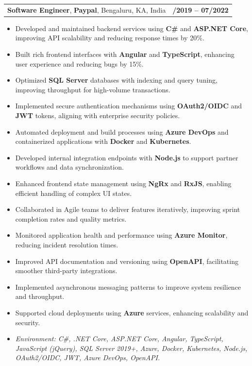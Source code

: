 \documentclass[letterpaper,11pt]{article}
\makeatletter
\newcommand{\resumeItem}[1]{
  \item\footnotesize{
    {#1 \vspace{-2pt}}
  }
}
\newcommand{\resumeSubheading}[4]{
  \vspace{-2pt}\item
    \begin{tabular*}{1.0\textwidth}[t]{l@{\extracolsep{\fill}}r}
      \textbf{\fontsize{10pt}{14pt}\selectfont #3}, \textbf{\fontsize{10pt}{14pt}\selectfont #1}, \fontsize{10pt}{14pt}\selectfont #4 & \textbf{\fontsize{10pt}{14pt}\selectfont #2} \\
    \end{tabular*}\vspace{-7pt}
}
\newcommand{\resumeItemListStart}{\begin{itemize}[leftmargin=*]}
\newcommand{\resumeItemListEnd}{\end{itemize}\vspace{-5pt}}
\makeatother
\begin{document}
\resumeSubheading
{Paypal}{08/2019 -- 07/2022}
{Software Engineer}{Bengaluru, KA, India}
\resumeItemListStart
  \resumeItem{Developed and maintained backend services using \textbf{C\#} and \textbf{ASP.NET Core}, improving API scalability and reducing response times by 20\%.}
  \resumeItem{Built rich frontend interfaces with \textbf{Angular} and \textbf{TypeScript}, enhancing user experience and reducing bugs by 15\%.}
  \resumeItem{Optimized \textbf{SQL Server} databases with indexing and query tuning, improving throughput for high-volume transactions.}
  \resumeItem{Implemented secure authentication mechanisms using \textbf{OAuth2/OIDC} and \textbf{JWT} tokens, aligning with enterprise security policies.}
  \resumeItem{Automated deployment and build processes using \textbf{Azure DevOps} and containerized applications with \textbf{Docker} and \textbf{Kubernetes}.}
  \resumeItem{Developed internal integration endpoints with \textbf{Node.js} to support partner workflows and data synchronization.}
  \resumeItem{Enhanced frontend state management using \textbf{NgRx} and \textbf{RxJS}, enabling efficient handling of complex UI states.}
  \resumeItem{Collaborated in Agile teams to deliver features iteratively, improving sprint completion rates and quality metrics.}
  \resumeItem{Monitored application health and performance using \textbf{Azure Monitor}, reducing incident resolution times.}
  \resumeItem{Improved API documentation and versioning using \textbf{OpenAPI}, facilitating smoother third-party integrations.}
  \resumeItem{Implemented asynchronous messaging patterns to improve system resilience and throughput.}
  \resumeItem{Supported cloud deployments using \textbf{Azure} services, enhancing scalability and security.}
  \resumeItem{\textit{Environment: C\#, .NET Core, ASP.NET Core, Angular, TypeScript, JavaScript (jQuery), SQL Server 2019+, Azure, Docker, Kubernetes, Node.js, OAuth2/OIDC, JWT, Azure DevOps, OpenAPI.}}
\resumeItemListEnd
\end{document}
